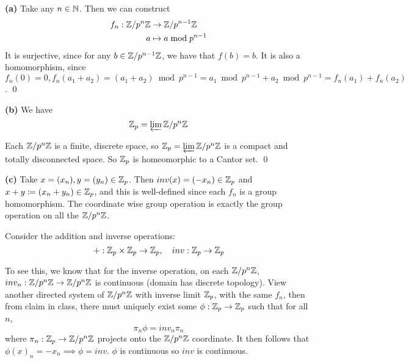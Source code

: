 \documentclass[a4paper, 10pt]{article}
\begin{document}
\begin{solution}
    \textbf{(a)} Take any $n \in \mathbb{N}$. Then we can construct
    \begin{align*}
        f_n: \mathbb{Z}/p^n \mathbb{Z} &\to \mathbb{Z}/p^{n-1} \mathbb{Z} \\    
            a &\mapsto a \bmod p^{n-1}
    \end{align*}
    It is surjective, since for any $b \in \mathbb{Z} /p^{n-1} \mathbb{Z}$, we have that $f(b) = b$. It is also a homomorphism, since $f_n(0) = 0, f_n(a_1 + a_2) = (a_1 + a_2) \bmod p^{n-1} = a_1 \bmod p^{n-1} + a_2 \bmod p^{n-1} = f_n(a_1) + f_n(a_2)$. \qed

    \textbf{(b)} We have \begin{equation*}
    \mathbb{Z}_p = \varprojlim \mathbb{Z}/p^n \mathbb{Z}
    \end{equation*}

    Each $\mathbb{Z}/p^{n} \mathbb{Z}$ is a finite, discrete space, so $\mathbb{Z}_p = \varprojlim \mathbb{Z}/p^n \mathbb{Z}$ is a compact and totally disconnected space. So $\mathbb{Z}_p$ is homeomorphic to a Cantor set. \qed

    \textbf{(c)} Take $x = (x_n), y = (y_n) \in \mathbb{Z}_p$. Then $inv(x) = (-x_n) \in \mathbb{Z}_p$ and $x + y \coloneqq (x_n + y_n) \in \mathbb{Z}_p$, and this is well-defined since each $f_n$ is a group homomorphism. The coordinate wise group operation is exactly the group operation on all the $\mathbb{Z}/p^n \mathbb{Z}$.

    Consider the addition and inverse operations:
    \begin{equation*}
    +: \mathbb{Z}_p \times \mathbb{Z}_p \to \mathbb{Z}_p, \quad inv: \mathbb{Z}_p \to \mathbb{Z}_p
    \end{equation*}

    To see this, we know that for the inverse operation, on each $\mathbb{Z}/p^n \mathbb{Z}$, $inv_n: \mathbb{Z}/p^n \mathbb{Z} \to \mathbb{Z}/p^n \mathbb{Z}$ is continuous (domain has discrete topology). View another directed system of $\mathbb{Z} /p^n \mathbb{Z}$ with inverse limit $\mathbb{Z}_p$, with the same $f_n$, then from claim in class, there must uniquely exist some $\phi: \mathbb{Z}_p \to \mathbb{Z}_p$ such that for all $n$, \begin{equation*}
    \pi_n \phi = inv_n \pi_n
    \end{equation*}
    where $\pi_n: \mathbb{Z}_p \to \mathbb{Z}/p^n \mathbb{Z}$ projects onto the $\mathbb{Z} /p^n \mathbb{Z}$ coordinate.
    It then follows that $\phi(x)_n = -x_n \implies \phi = inv$. $\phi$ is continuous so $inv$ is continuous.


\end{solution}
\end{document}
